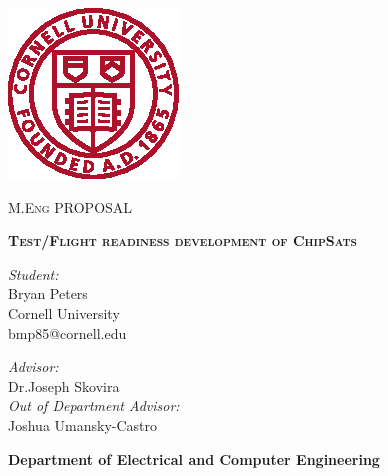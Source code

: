 \documentclass[a4, 12pt]{article}
\begin{document}
\begin{titlepage}

\begin{center}
   \includegraphics[scale=1.6]{Images/bold_cornell_seal_pms187_red.eps} 
\end{center}
   
\thispagestyle{fancy}

\center

\textsc{\large M.Eng PROPOSAL}

\vspace{0.5in}

\noindent\makebox[\linewidth]{\rule{\linewidth}{1.2pt}}
\textsc{ \textbf{\large Test/Flight readiness development of ChipSats}}
\noindent\makebox[\linewidth]{\rule{\linewidth}{1.2pt}}

\vspace{0.5in}

\begin{minipage}{0.48\textwidth}
    \begin{flushleft}
        \textit{Student:} \\
        Bryan Peters \\
        Cornell University \\
        bmp85@cornell.edu
    \end{flushleft}
\end{minipage}
\begin{minipage}{0.48\textwidth}
    \begin{flushright}
    \textit{Advisor:} \\
    Dr.Joseph Skovira \\
    \textit{Out of Department Advisor:}\\
    Joshua Umansky-Castro\\
    \end{flushright}
\end{minipage}

\vspace{2in}

\textbf{\large Department of Electrical and Computer Engineering} \\


\end{titlepage}
\end{document}
